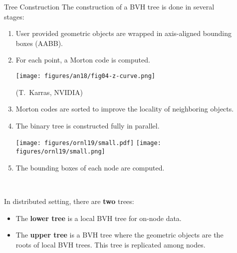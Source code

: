 \documentclass[final,hyperref={pdfpagelabels=false}]{beamer}
\begin{document}
\begin{frame}[t,fragile]
\begin{columns}[t]
\begin{column}{.450\textwidth}
\begin{block}{\centering Tree Construction}
  The construction of a BVH tree is done in several stages:
  \begin{enumerate}
    \item User provided geometric objects are wrapped in axis-aligned bounding
      boxes (AABB).
    \item
      For each point, a Morton code is computed.

      \begin{center}
      \texttt{[image: figures/an18/fig04-z-curve.png]}

        {\small (T.~Karras, NVIDIA)}
      \end{center}
    \item
      Morton codes are sorted to improve the locality of neighboring objects.
    \item
      The binary tree is constructed fully in parallel.

      \begin{center}
      \texttt{[image: figures/ornl19/small.pdf]}
      \texttt{[image: figures/ornl19/small.png]}
      \end{center}
    \item The bounding boxes of each node are computed.
  \end{enumerate}

  \

  In distributed setting, there are \textbf{two} trees:
  \begin{itemize}
    \item
      The \textbf{lower tree} is a local BVH tree for on-node data.
    \item
      The \textbf{upper tree} is a BVH tree where the geometric objects are the
      roots of local BVH trees. This tree is replicated among nodes.
  \end{itemize}

\end{block}

\end{column} %

\begin{column}{.03\textwidth}\end{column}

\begin{column}{.480\textwidth}


\end{column}
\end{columns}
\end{frame}
\end{document}
